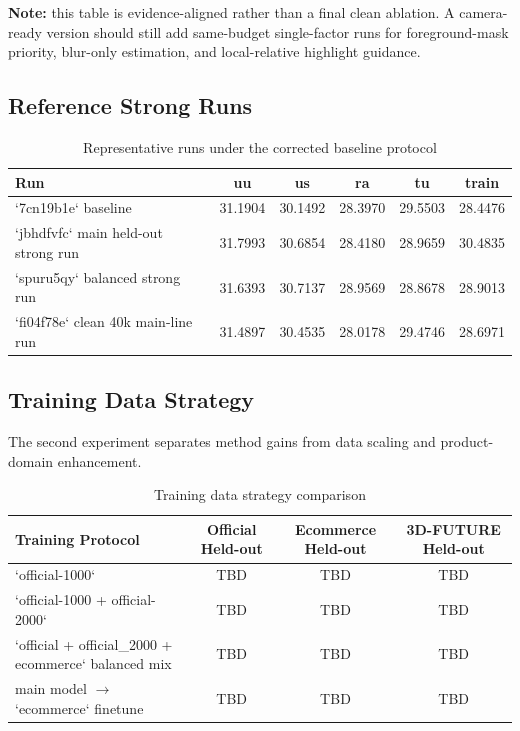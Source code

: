 \documentclass[UTF8,a4paper]{ctexart}
\begin{document}
\noindent\textbf{Note:} this table is evidence-aligned rather than a final clean ablation. A camera-ready version should still add same-budget single-factor runs for foreground-mask priority, blur-only estimation, and local-relative highlight guidance.

\subsection{Reference Strong Runs}

\begin{table}[htbp]
\centering
\caption{Representative runs under the corrected baseline protocol}
\begin{tabular}{lccccc}
\toprule
Run & uu & us & ra & tu & train \\
\midrule
`7cn19b1e` baseline & 31.1904 & 30.1492 & 28.3970 & 29.5503 & 28.4476 \\
`jbhdfvfc` main held-out strong run & 31.7993 & 30.6854 & 28.4180 & 28.9659 & 30.4835 \\
`spuru5qy` balanced strong run & 31.6393 & 30.7137 & 28.9569 & 28.8678 & 28.9013 \\
`fi04f78e` clean 40k main-line run & 31.4897 & 30.4535 & 28.0178 & 29.4746 & 28.6971 \\
\bottomrule
\end{tabular}
\end{table}

\subsection{Training Data Strategy}

The second experiment separates method gains from data scaling and product-domain enhancement.

\begin{table}[htbp]
\centering
\caption{Training data strategy comparison}
\begin{tabular}{lccc}
\toprule
Training Protocol & Official Held-out & Ecommerce Held-out & 3D-FUTURE Held-out \\
\midrule
`official-1000` & TBD & TBD & TBD \\
`official-1000 + official-2000` & TBD & TBD & TBD \\
`official + official\_2000 + ecommerce` balanced mix & TBD & TBD & TBD \\
main model $\rightarrow$ `ecommerce` finetune & TBD & TBD & TBD \\
\bottomrule
\end{tabular}
\end{table}
\end{document}
